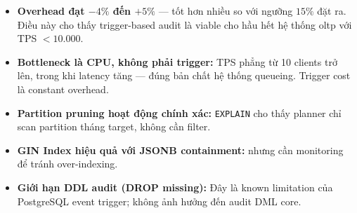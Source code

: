 \begin{itemize}
    \item \textbf{Overhead đạt $-4\%$ đến $+5\%$} --- tốt hơn nhiều so với ngưỡng $15\%$ đặt ra. Điều này cho thấy trigger-based audit là viable cho hầu hết hệ thống \ac{oltp} với TPS $< 10.000$.
    \item \textbf{Bottleneck là CPU, không phải trigger:} TPS phẳng từ 10 clients trở lên, trong khi latency tăng --- đúng bản chất hệ thống queueing. Trigger cost là constant overhead.
    \item \textbf{Partition pruning hoạt động chính xác:} \texttt{EXPLAIN} cho thấy planner chỉ scan partition tháng target, không cần filter.
    \item \textbf{GIN Index hiệu quả với JSONB containment:} nhưng cần monitoring để tránh over-indexing.
    \item \textbf{Giới hạn DDL audit (DROP missing):} Đây là known limitation của PostgreSQL event trigger; không ảnh hưởng đến audit DML core.
\end{itemize}

